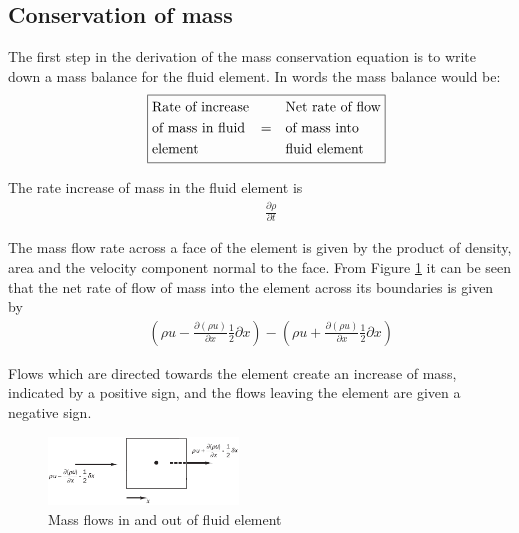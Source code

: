 \newpage
\subsection{Conservation of mass} 
The first step in the derivation of the mass conservation equation is to write down a mass balance for the fluid element. In words the mass balance would be:
\setlength{\jot}{0pt}%
\begin{align*}
&&\boxed{
	\begin{aligned}
		&\text{Rate of increase}    &&\text{Net rate of flow} \nonumber \\
		&\text{of mass in fluid} \hspace{0.3cm} =  &&\text{of mass into} \nonumber \\
		&\text{element}  		 	&&\text{fluid element} \nonumber \\
	\end{aligned}
}
\end{align*}

The rate increase of mass in the fluid element is
\begin{align}
	&&\frac{\partial \rho}{\partial t}
	\label{eq1}
\end{align}

The mass flow rate across a face of the element is given by the product of density, area and the velocity component normal to the face. From Figure \ref{fig6} it can be seen that the net rate of flow of mass into the element across its boundaries is given by 
\begin{align}
&&\left(\rho u - \frac{\partial (\rho u)}{\partial x}\frac{1}{2}\partial x\right) -\left( \rho u + \frac{\partial (\rho u)}{\partial x}\frac{1}{2}\partial x\right)
\label{eq2}
\end{align}

Flows which are directed towards the element create an increase of mass, indicated by a positive sign, and the flows leaving the element are given a negative sign.

\begin{figure}[H]
	\centering
	\includegraphics[width =0.45\textwidth]{Images/fig6.png}
	\caption{Mass flows in and out of fluid element \cite{Versteeg2007}}		
	\label{fig6}
\end{figure}

